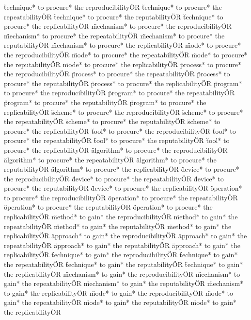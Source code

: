 \documentclass[
10pt, %
a4paper, %
oneside, %
headinclude,footinclude, %
BCOR5mm, %
]{scrartcl}
\begin{document}
\"technique* to procure* the reproducibility\" OR \"technique* to procure* the repeatability\" OR \"technique* to procure* the reputability\" OR \"technique* to procure* the replicability\" OR 
\"mechanism* to procure* the reproducibility\" OR \"mechanism* to procure* the repeatability\" OR \"mechanism* to procure* the reputability\" OR \"mechanism* to procure* the replicability\" OR 
\"mode* to procure* the reproducibility\" OR \"mode* to procure* the repeatability\" OR \"mode* to procure* the reputability\" OR \"mode* to procure* the replicability\" OR 
\"process* to procure* the reproducibility\" OR \"process* to procure* the repeatability\" OR \"process* to procure* the reputability\" OR \"process* to procure* the replicability\" OR 
\"program* to procure* the reproducibility\" OR \"program* to procure* the repeatability\" OR \"program* to procure* the reputability\" OR \"program* to procure* the replicability\" OR 
\"scheme* to procure* the reproducibility\" OR \"scheme* to procure* the repeatability\" OR \"scheme* to procure* the reputability\" OR \"scheme* to procure* the replicability\" OR 
\"tool* to procure* the reproducibility\" OR \"tool* to procure* the repeatability\" OR \"tool* to procure* the reputability\" OR \"tool* to procure* the replicability\" OR 
\"algorithm* to procure* the reproducibility\" OR \"algorithm* to procure* the repeatability\" OR \"algorithm* to procure* the reputability\" OR \"algorithm* to procure* the replicability\" OR 
\"device* to procure* the reproducibility\" OR \"device* to procure* the repeatability\" OR \"device* to procure* the reputability\" OR \"device* to procure* the replicability\" OR 
\"operation* to procure* the reproducibility\" OR \"operation* to procure* the repeatability\" OR \"operation* to procure* the reputability\" OR \"operation* to procure* the replicability\" OR 
\"method* to gain* the reproducibility\" OR \"method* to gain* the repeatability\" OR \"method* to gain* the reputability\" OR \"method* to gain* the replicability\" OR 
\"approach* to gain* the reproducibility\" OR \"approach* to gain* the repeatability\" OR \"approach* to gain* the reputability\" OR \"approach* to gain* the replicability\" OR 
\"technique* to gain* the reproducibility\" OR \"technique* to gain* the repeatability\" OR \"technique* to gain* the reputability\" OR \"technique* to gain* the replicability\" OR 
\"mechanism* to gain* the reproducibility\" OR \"mechanism* to gain* the repeatability\" OR \"mechanism* to gain* the reputability\" OR \"mechanism* to gain* the replicability\" OR 
\"mode* to gain* the reproducibility\" OR \"mode* to gain* the repeatability\" OR \"mode* to gain* the reputability\" OR \"mode* to gain* the replicability\" OR 
\end{document}
